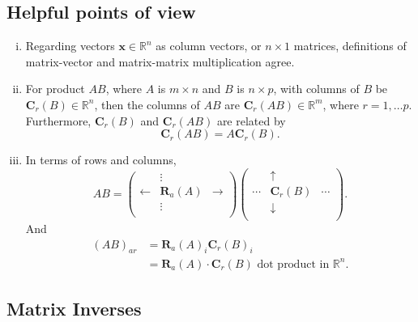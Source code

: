 \documentclass[10pt]{article}
\begin{document}
    \subsection{Helpful points of view}
    \begin{enumerate}[(i)]
        \item Regarding vectors $ \mathbf{x}\in \mathbb{R}^{n}$ as column vectors, or $n\times 1$ matrices, definitions of matrix-vector and matrix-matrix multiplication agree.
        \item For product $ AB $, where $ A $ is $m\times n$ and $B$ is $ n \times p $, with columns of $ B $ be $ \mathbf{C}_r(B)\in \mathbb{R}^{n} $, then the columns of $ AB $ are $ \mathbf{C}_{r}(AB)\in \mathbb{R}^{m} $, where $r=1,\dots p$. Furthermore, $ \mathbf{C}_r(B) $ and $ \mathbf{C}_r(AB) $ are related by 
        \[
            \mathbf{C}_r(AB)=A \mathbf{C}_r(B)
        .\]
        \item In terms of rows and columns, 
        \[
            AB=\begin{pmatrix}
                &\vdots&\\
                \leftarrow&\mathbf{R}_a(A)&\rightarrow\\
                &\vdots&\\
            \end{pmatrix}\begin{pmatrix}
                &\uparrow&\\
                \cdots&\mathbf{C}_r(B)&\cdots\\
                &\downarrow&\\
            \end{pmatrix}
        .\]
        And 
        \[
            \begin{aligned}
                (AB)_{ar}&=\mathbf{R}_{a}(A)_i \mathbf{C}_r(B)_i\\
                &= \mathbf{R}_a(A) \cdot \mathbf{C}_r(B) \text{ dot product in } \mathbb{R}^{n}.
            \end{aligned}
        \]
    \end{enumerate}

    \subsection{Matrix Inverses}
\end{document}
